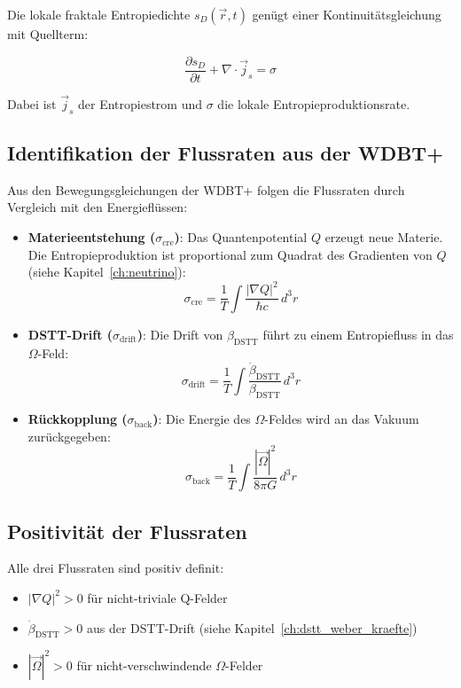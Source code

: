 Die lokale fraktale Entropiedichte $s_D(\vec{r}, t)$ genügt einer Kontinuitätsgleichung 
mit Quellterm:

\[
\frac{\partial s_D}{\partial t} + \nabla \cdot \vec{j}_s = \sigma \tag{L.9}
\]

Dabei ist $\vec{j}_s$ der Entropiestrom und $\sigma$ die lokale Entropieproduktionsrate.

\subsection{Identifikation der Flussraten aus der WDBT+}
\label{sub:fraktale_entropie_identifikation}

Aus den Bewegungsgleichungen der WDBT+ folgen die Flussraten durch Vergleich mit den 
Energieflüssen:

\begin{itemize}
    \item \textbf{Materieentstehung ($\sigma_{\text{cre}}$)}:  
          Das Quantenpotential $Q$ erzeugt neue Materie. Die Entropieproduktion ist 
          proportional zum Quadrat des Gradienten von $Q$ (siehe Kapitel~\ref{ch:neutrino}):
          \[
          \sigma_{\text{cre}} = \frac{1}{T} \int \frac{|\nabla Q|^2}{\hbar c} \, d^3 r \tag{L.10}
          \]
    
    \item \textbf{DSTT-Drift ($\sigma_{\text{drift}}$)}:  
          Die Drift von $\beta_{\text{DSTT}}$ führt zu einem Entropiefluss in das 
          $\Omega$-Feld:
          \[
          \sigma_{\text{drift}} = \frac{1}{T} \int \frac{\dot{\beta}_{\text{DSTT}}}{\beta_{\text{DSTT}}} \, d^3 r \tag{L.11}
          \]
    
    \item \textbf{Rückkopplung ($\sigma_{\text{back}}$)}:  
          Die Energie des $\Omega$-Feldes wird an das Vakuum zurückgegeben:
          \[
          \sigma_{\text{back}} = \frac{1}{T} \int \frac{|\vec{\Omega}|^2}{8\pi G} \, d^3 r \tag{L.12}
          \]
\end{itemize}

\subsection{Positivität der Flussraten}
\label{sub:fraktale_entropie_positivitaet}

Alle drei Flussraten sind positiv definit:
\begin{itemize}
    \item $|\nabla Q|^2 > 0$ für nicht-triviale Q-Felder
    \item $\dot{\beta}_{\text{DSTT}} > 0$ aus der DSTT-Drift (siehe Kapitel~\ref{ch:dstt_weber_kraefte})
    \item $|\vec{\Omega}|^2 > 0$ für nicht-verschwindende $\Omega$-Felder
\end{itemize}

